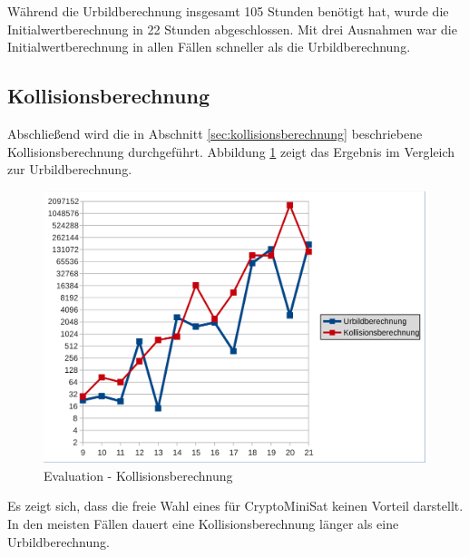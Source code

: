 Während die Urbildberechnung insgesamt 105 Stunden benötigt hat, wurde die Initialwertberechnung in 22 Stunden
abgeschlossen. Mit drei Ausnahmen war die Initialwertberechnung in allen Fällen schneller als die Urbildberechnung.

\subsection{Kollisionsberechnung}
Abschließend wird die in Abschnitt \ref{sec:kollisionsberechnung} beschriebene Kollisionsberechnung durchgeführt.
Abbildung \ref{fig:eval_kollision} zeigt das Ergebnis im Vergleich zur Urbildberechnung. \clearpage
\begin{figure}[!h]
  \centering
  \includegraphics[scale=0.55]{images/eval_kollision}
  \caption{Evaluation - Kollisionsberechnung}
  \label{fig:eval_kollision}
\end{figure}

Es zeigt sich, dass die freie Wahl eines  für CryptoMiniSat keinen Vorteil darstellt. In den meisten Fällen
dauert eine Kollisionsberechnung länger als eine Urbildberechnung.